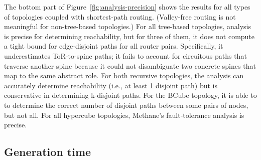 \documentclass[numbers, 10pt, preprint]{sigplanconf}
\newcommand{\sysname}{{\small \sf Methane}\xspace}
\newcommand{\para}[1]{\paragraph*{\textbf{#1}}}
\begin{document}
The bottom part of Figure~\ref{fig:analysis-precision} shows the results for all types of topologies coupled with shortest-path routing. (Valley-free routing is not meaningful for non-tree-based topologies.) For all tree-based topologies, analysis is precise for determining reachability, but for three of them, it does not compute a tight bound for edge-disjoint paths for all router pairs. Specifically, it underestimates ToR-to-spine paths; it fails to account for circuitous paths that traverse another spine because it could not disambiguate two concrete spines that map to the same abstract role.
For both recursive topologies, the analysis can accurately determine reachability (i.e., at least 1 disjoint path) but is conservative in determining k-disjoint paths. For the BCube topology, it is able to to determine the correct number of disjoint paths between some pairs of nodes, but not all. For all hypercube topologies, \sysname's fault-tolerance analysis is precise.


%


\subsection{Generation time}
\end{document}
